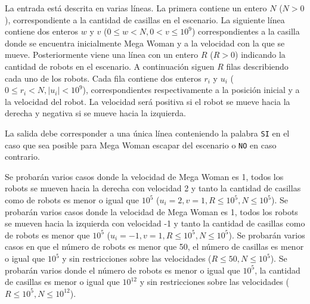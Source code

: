 \documentclass{oci}
\begin{document}
\begin{problemDescription}
\end{problemDescription}

\begin{inputDescription}
  La entrada está descrita en varias líneas.
  La primera contiene un entero $N$ ($N>0$), correspondiente a la cantidad de
  casillas en el escenario.
  La siguiente línea contiene dos enteros $w$ y $v$ ($0\leq w< N, 0<v\leq 10^9$)
  correspondientes a la casilla donde se encuentra inicialmente Mega Woman y a la
  velocidad con la que se mueve.
  Posteriormente viene una línea con un entero $R$ ($R>0$) indicando la cantidad de
  robots en el escenario.
  A continuación siguen $R$ filas describiendo cada uno de los robots.
  Cada fila contiene dos enteros $r_i$ y $u_i$ ($0\leq r_i < N, |u_i|< 10^9$),
  correspondientes respectivamente a la posición inicial y a la velocidad del
  robot.
  La velocidad será positiva si el robot se mueve hacia la derecha y negativa si
  se mueve hacia la izquierda.
\end{inputDescription}

\begin{outputDescription}
La salida debe corresponder a una única línea conteniendo la palabra \texttt{SI}
en el caso que sea posible para Mega Woman escapar del escenario o \texttt{NO}
en caso contrario.
\end{outputDescription}

\begin{scoreDescription}
   Se probarán varios casos donde la velocidad de Mega Woman es 1,
  todos los robots se mueven hacia la derecha con velocidad 2 y tanto la
  cantidad de casillas como de robots es menor o igual que $10^5$ ($u_i=2, v=1,
  R\leq 10^5, N\leq 10^5$).
   Se probarán varios casos donde la velocidad de Mega Woman es 1,
  todos los robots se mueven hacia la izquierda con velocidad -1 y tanto la cantidad
  de casillas como de robots es menor que $10^5$ ($u_i=-1, v=1, R\leq 10^5,
  N\leq 10^5$).
   Se probarán varios casos en que el número de robots es menor que
  50, el número de casillas es menor o igual que $10^5$ y sin restricciones sobre las
  velocidades ($R\leq 50, N\leq 10^5$).
   Se probarán varios donde el número de robots es menor o igual que
  $10^5$, la cantidad de casillas es menor o igual que $10^{12}$ y sin
  restricciones sobre las velocidades ($R\leq 10^5, N \leq10^{12}$).
\end{scoreDescription}

\begin{sampleDescription}
\end{sampleDescription}
\end{document}
